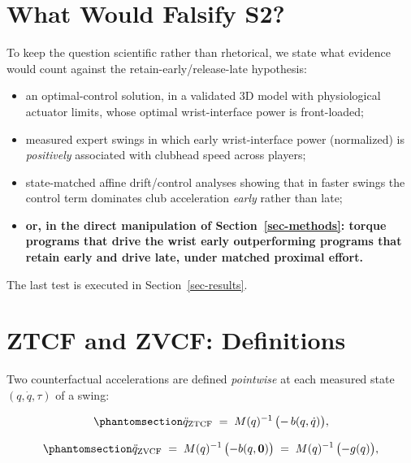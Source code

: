 \documentclass[
  letterpaper,
]{report}
\providecommand{\tightlist}{%
  \setlength{\itemsep}{0pt}\setlength{\parskip}{0pt}}
\begin{document}
\section{What Would Falsify S2?}\label{sec-falsify}

To keep the question scientific rather than rhetorical, we state what
evidence would count against the retain-early/release-late hypothesis:

\begin{itemize}
\tightlist
\item
  an optimal-control solution, in a validated 3D model with
  physiological actuator limits, whose optimal wrist-interface power is
  front-loaded;
\item
  measured expert swings in which early wrist-interface power
  (normalized) is \emph{positively} associated with clubhead speed
  across players;
\item
  state-matched affine drift/control analyses showing that in faster
  swings the control term dominates club acceleration \emph{early}
  rather than late;
\item
  \textbf{or, in the direct manipulation of Section~\ref{sec-methods}:
  torque programs that drive the wrist early outperforming programs that
  retain early and drive late, under matched proximal effort.}
\end{itemize}

The last test is executed in Section~\ref{sec-results}.

\section{ZTCF and ZVCF: Definitions}\label{sec-ztcf-defs}

Two counterfactual accelerations are defined \emph{pointwise} at each
measured state \((q, \dot q, \tau)\) of a swing:

\begin{equation}\phantomsection\label{eq-ztcf}{
\ddot q_{\mathrm{ZTCF}}
  \;=\; M(q)^{-1}\,\bigl(-\,b(q,\dot q)\bigr),
}\end{equation}

\begin{equation}\phantomsection\label{eq-zvcf}{
\ddot q_{\mathrm{ZVCF}}
  \;=\; M(q)^{-1}\,\bigl(-b(q,\mathbf{0})\bigr)
  \;=\; M(q)^{-1}\,\bigl(-g(q)\bigr),
}\end{equation}
\end{document}
